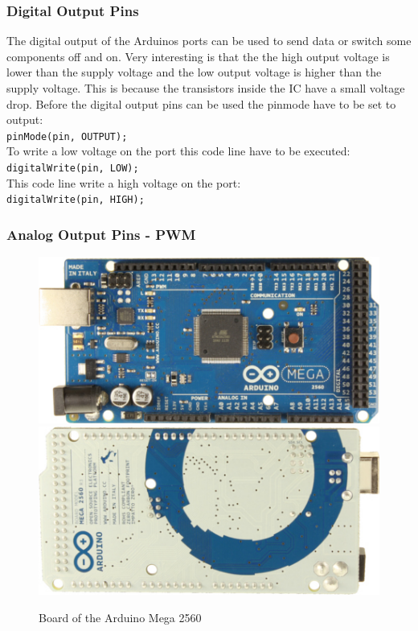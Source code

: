 \subsubsection{Digital Output Pins}\label{sec:digitalOutputPins}
The digital output of the Arduinos ports can be used to send data or switch some components off and on.
Very interesting is that the the high output voltage is lower than the supply voltage and the low output voltage is higher than the supply voltage.
This is because the transistors inside the IC have a small voltage drop.
Before the digital output pins can be used the pinmode have to be set to output:\\
\lstinline|pinMode(pin, OUTPUT);|\\
To write a low voltage on the port this code line have to be executed:\\
\lstinline|digitalWrite(pin, LOW);|\\
This code line write a high voltage on the port:\\
\lstinline|digitalWrite(pin, HIGH);|\\


\subsubsection{Analog Output Pins - PWM}\label{sec:analogOutputPinsPWM}
\begin{figure}
\includegraphics[scale=0.5]{picturesArduino/arduinoMega2560_R3_Front.jpg}
\includegraphics[scale=0.5]{picturesArduino/arduinoMega2560_R3_Back.jpg}
\caption{Board of the Arduino Mega 2560}
\label{fig:pwm}
\end{figure}

